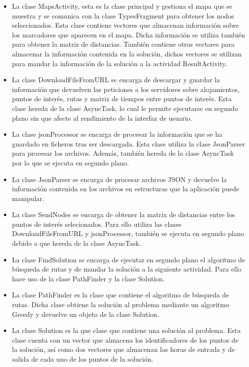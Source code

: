 \begin{itemize}
	\item La clase MapsActivity, esta es la clase principal y gestiona el mapa que se muestra y se comunica con la clase TypesFragment para obtener los nodos seleccionados. Esta clase contiene vectores que almacenan información sobre los marcadores que aparecen en el mapa. Dicha información se utiliza también para obtener la matriz de distancias. También contiene otros vectores para almacenar la información contenida en la solución, dichos vectores se utilizan para mandar la información de la solución a la actividad ResultActivity.
	\item La clase DownloadFileFromURL se encarga de descargar y guardar la información que devuelven las peticiones a los servidores sobre alojamientos, puntos de interés, rutas y matriz de tiempos entre puntos de interés. Esta clase hereda de la clase AsyncTask, lo cual le permite ejecutarse en segundo plano sin que afecte al rendimiento de la interfaz de usuario.
	\item La clase jsonProcessor se encarga de procesar la información que se ha guardado en ficheros tras ser descargada. Esta clase utiliza la clase JsonParser para procesar los archivos. Además, también hereda de la clase AsyncTask por lo que se ejecuta en segundo plano.
	\item La clase JsonParser se encarga de procesar archivos JSON y devuelve la información contenida en los archivos en estructuras que la aplicación puede manipular.
	\item La clase SendNodes se encarga de obtener la matrix de distancias entre los puntos de interés selecionados. Para ello utiliza las clases DownloadFileFromURL y jsonProcessor, también se ejecuta en segundo plano debido a que hereda de la clase AsyncTask.
	\item La clase FindSolution se encarga de ejecutar en segundo plano el algoritmo de búsqueda de rutas y de mandar la solución a la siguiente actividad. Para ello hace uso de la clase PathFinder y la clase Solution.
	\item La clase PathFinder es la clase que contiene el algoritmo de búsqueda de rutas. Dicha clase obtiene la solución al problema mediante un algoritmo Greedy y devuelve un objeto de la clase Solution.
	\item La clase Solution es la que clase que contiene una solución al problema. Esta clase cuenta con un vector que almacena los identificadores de los puntos de la solución, así como dos vectores que almacenan las horas de entrada y de salida de cada uno de los puntos de la solución.
\end{itemize}
